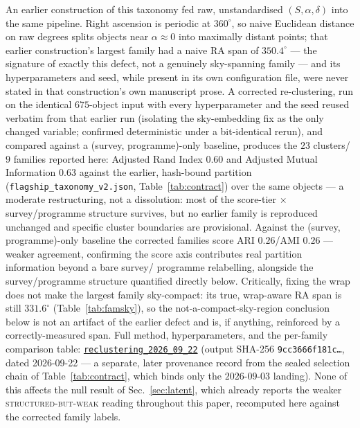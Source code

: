 \documentclass[aps,prd,twocolumn,superscriptaddress,nofootinbib,longbibliography,floatfix]{revtex4-2}
\newcommand{\repoSHA}{main}
\newcommand{\artifactdirlink}[2]{\href{https://github.com/Hubify-Projects/bigbounce/tree/\repoSHA/#1}{\texttt{#2}}}
\begin{document}
An earlier construction of this taxonomy fed raw, unstandardised
$(S,\alpha,\delta)$ into the same pipeline. Right ascension is periodic at
$360^\circ$, so naive Euclidean distance on raw degrees splits objects near
$\alpha\approx0$ into maximally distant points; that earlier construction's
largest family had a naive RA span of $350.4^\circ$ --- the signature of
exactly this defect, not a genuinely sky-spanning family --- and its
hyperparameters and seed, while present in its own configuration file, were
never stated in that construction's own manuscript prose. A corrected
re-clustering, run on the identical $675$-object input with every
hyperparameter and the seed reused verbatim from that earlier run (isolating
the sky-embedding fix as the only changed variable; confirmed deterministic
under a bit-identical rerun), and compared against a (survey,
programme)-only baseline, produces the $23$ clusters/$9$ families reported
here: Adjusted Rand Index $0.60$ and Adjusted Mutual Information $0.63$
against the earlier, hash-bound partition
(\texttt{flagship\_taxonomy\_v2.json}, Table~\ref{tab:contract}) over the
same objects --- a moderate restructuring, not a dissolution: most of the
score-tier $\times$ survey/programme structure survives, but no earlier
family is reproduced unchanged and specific cluster boundaries are
provisional. Against the (survey, programme)-only baseline the corrected
families score ARI $0.26$/AMI $0.26$ --- weaker agreement, confirming the
score axis contributes real partition information beyond a bare survey/
programme relabelling, alongside the survey/programme structure quantified
directly below. Critically, fixing the wrap does
not make the largest family sky-compact: its true, wrap-aware RA span is
still $331.6^\circ$ (Table~\ref{tab:famsky}), so the
not-a-compact-sky-region conclusion below is not an artifact of the earlier
defect and is, if anything, reinforced by a correctly-measured span. Full
method, hyperparameters, and the per-family comparison table:
\artifactdirlink{pipelines/p1_highz_tracers/anomaly_flagship_draft/reclustering_2026_09_22}{reclustering\_2026\_09\_22}
(output SHA-256 \texttt{9cc3666f181c\ldots}, dated 2026-09-22 --- a separate,
later provenance record from the sealed selection chain of
Table~\ref{tab:contract}, which binds only the $2026$-$09$-$03$ landing).
None of this affects the null result of Sec.~\ref{sec:latent}, which already
reports the weaker \textsc{structured-but-weak} reading throughout this
paper, recomputed here against the corrected family labels.
\end{document}
